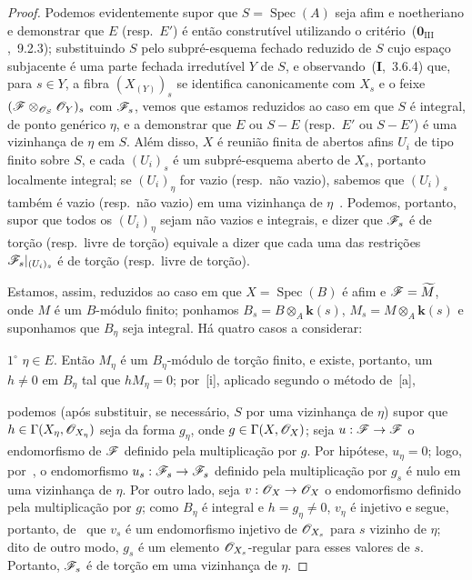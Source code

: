 \begin{proof}
Podemos evidentemente supor que $S=\operatorname{Spec}(A)$ seja afim e noetheriano e demonstrar que $E$ \textnormal{(}resp.\ $E'$\textnormal{)} é então construtível utilizando o critério~($\mathbf{0}_{\mathrm{III}}$,~9.2.3); substituindo $S$ pelo subpré-esquema fechado reduzido de $S$ cujo espaço subjacente é uma parte fechada irredutível $Y$ de $S$, e observando~(\textbf{I},~3.6.4) que, para $s\in Y$, a fibra $(X_{(Y)})_s$ se identifica canonicamente com $X_s$ e o feixe $(\mathscr{F}\otimes_{\mathscr{O}_S}\mathscr{O}_Y)_s$ com $\mathscr{F}_s$, vemos que estamos reduzidos ao caso em que $S$ é integral, de ponto genérico $\eta$, e a demonstrar que $E$ ou $S-E$ \textnormal{(}resp.\ $E'$ ou $S-E'$\textnormal{)} é uma vizinhança de $\eta$ em $S$.
Além disso, $X$ é reunião finita de abertos afins $U_i$ de tipo finito sobre $S$, e cada $(U_i)_s$ é um subpré-esquema aberto de $X_s$, portanto localmente integral; se $(U_i)_\eta$ for vazio \textnormal{(}resp.\ não vazio\textnormal{)}, sabemos que $(U_i)_s$ também é vazio \textnormal{(}resp.\ não vazio\textnormal{)} em uma vizinhança de $\eta$~.
Podemos, portanto, supor que todos os $(U_i)_\eta$ sejam não vazios e integrais, e dizer que $\mathscr{F}_s$ é de torção \textnormal{(}resp.\ livre de torção\textnormal{)} equivale a dizer que cada uma das restrições $\mathscr{F}_s|_{(U_i)_s}$ é de torção \textnormal{(}resp.\ livre de torção\textnormal{)}.

Estamos, assim, reduzidos ao caso em que $X=\operatorname{Spec}(B)$ é afim e $\mathscr{F}=\widetilde{M}$, onde $M$ é um $B$-módulo finito; ponhamos $B_s=B\otimes_A\mathbf{k}(s)$, $M_s=M\otimes_A\mathbf{k}(s)$ e suponhamos que $B_\eta$ seja integral.
Há quatro casos a considerar:

$1^\circ$ $\eta\in E$.
Então $M_\eta$ é um $B_\eta$-módulo de torção finito, e existe, portanto, um $h\neq0$ em $B_\eta$ tal que $hM_\eta=0$; por~[i], aplicado segundo o método de~[a],


podemos \textnormal{(}após substituir, se necessário, $S$ por uma vizinhança de $\eta$\textnormal{)} supor que $h\in\Gamma(X_\eta,\mathscr{O}_{X_\eta})$ seja da forma $g_\eta$, onde $g\in\Gamma(X,\mathscr{O}_X)$; seja $u:\sh{F}\to\sh{F}$ o endomorfismo de $\mathscr{F}$ definido pela multiplicação por $g$.
Por hipótese, $u_\eta=0$; logo, por~, o endomorfismo $u_s:\sh{F}_s\to\sh{F}_s$ definido pela multiplicação por $g_s$ é nulo em uma vizinhança de $\eta$.
Por outro lado, seja $v:\sh{O}_X\to\sh{O}_X$ o endomorfismo definido pela multiplicação por $g$; como $B_\eta$ é integral e $h=g_\eta\neq0$, $v_\eta$ é injetivo e segue, portanto, de~ que $v_s$ é um endomorfismo injetivo de $\mathscr{O}_{X_s}$ para $s$ vizinho de $\eta$; dito de outro modo, $g_s$ é um elemento $\mathscr{O}_{X_s}$-regular para esses valores de $s$.
Portanto, $\mathscr{F}_s$ é de torção em uma vizinhança de $\eta$.


\end{proof}
